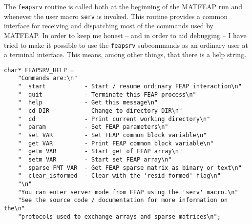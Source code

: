 The {\tt feapsrv} routine is called both at the beginning of the
MATFEAP run and whenever the user macro {\tt serv} is invoked.
This routine provides a common interface for receiving and dispatching
most of the commands used by MATFEAP.  In order to keep me honest --
and in order to aid debugging -- I have tried to make it possible to
use the {\tt feapsrv} subcommands as an ordinary user at a terminal
interface.  This means, among other things, that there is a help string.

\begin{verbatim}
char* FEAPSRV_HELP = 
    "Commands are:\n"
    "  start           - Start / resume ordinary FEAP interaction\n"
    "  quit            - Terminate this FEAP process\n"
    "  help            - Get this message\n"
    "  cd DIR          - Change to directory DIR\n"
    "  cd              - Print current working directory\n"
    "  param           - Set FEAP parameters\n"
    "  set VAR         - Set FEAP common block variable\n"
    "  get VAR         - Print FEAP common block variable\n"
    "  getm VAR        - Start get of FEAP array\n"
    "  setm VAR        - Start set FEAP array\n"
    "  sparse FMT VAR  - Get FEAP sparse matrix as binary or text\n"
    "  clear_isformed  - Clear with the 'resid formed' flag\n"
    "\n"
    "You can enter server mode from FEAP using the 'serv' macro.\n"
    "See the source code / documentation for more information on the\n"
    "protocols used to exchange arrays and sparse matrices\n";


\end{verbatim}

